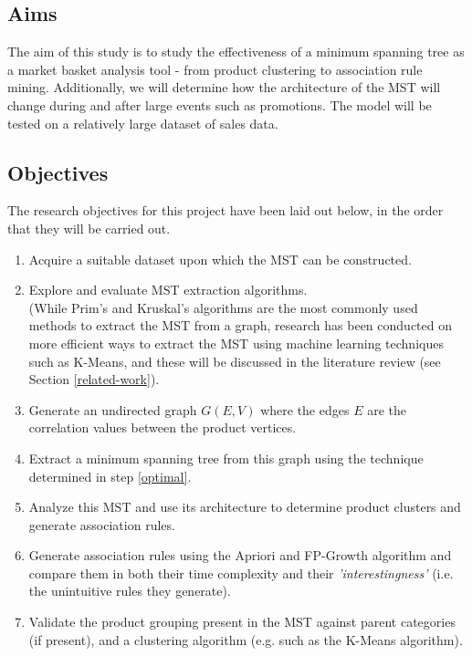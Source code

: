 \documentclass[a4paper,11pt]{article}
\begin{document}
\subsection{Aims}
The aim of this study is to study the effectiveness of a minimum spanning tree as a market basket analysis tool - from product clustering to association rule mining.  Additionally, we will determine how the architecture of the MST will change during and after large events such as promotions. The model will be tested on a relatively large dataset of sales data.

\subsection{Objectives}
The research objectives for this project have been laid out below, in the order that they will be carried out.
\begin{enumerate}
\item Acquire a suitable dataset upon which the MST can be constructed.

\item \label{optimal} Explore and evaluate MST extraction algorithms.
\\(While Prim's \cite{prims}\cite{prims_og} and Kruskal's \cite{kruskal} algorithms are the most commonly used methods to extract the MST from a graph, research has been conducted on more efficient ways to extract the MST using machine learning techniques such as K-Means, and these will be discussed in the literature review (see Section \ref{related-work}).

\item Generate an undirected graph $G(E,V)$ where the edges $E$ are the correlation values between the product vertices.

\item Extract a minimum spanning tree from this graph using the technique determined in step \ref{optimal}. 

\item Analyze this MST and use its architecture to determine product clusters and generate association rules.

\item Generate association rules using the Apriori and FP-Growth algorithm and compare them in both their time complexity and their \textit{'interestingness'} (i.e. the unintuitive rules they generate).

\item Validate the product grouping present in the MST against parent categories (if present), and a clustering algorithm (e.g.  such as the K-Means algorithm).
\end{enumerate}
\end{document}
